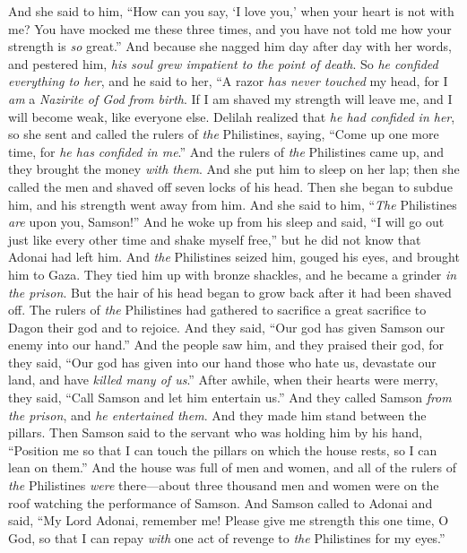 \begin{biblechapter}
\verse And she said to him, “How can you say, ‘I love you,’ when your heart is not with me? You have mocked me these three times, and you have not told me how your strength is \textit{so} great.”
\verse And because she nagged him day after day with her words, and pestered him, \textit{his soul grew impatient to the point of death}.
\verse So \textit{he confided everything to her}, and he said to her, “A razor \textit{has never touched} my head, for I \textit{am} a \textit{Nazirite of God} \textit{from birth}. If I am shaved my strength will leave me, and I will become weak, like everyone else.
\verse Delilah realized that \textit{he had confided in her}, so she sent and called the rulers of \textit{the} Philistines, saying, “Come up one more time, for \textit{he has confided in me}.” And the rulers of \textit{the} Philistines came up, and they brought the money \textit{with them}.
\verse And she put him to sleep on her lap; then she called the men and shaved off seven locks of his head. Then she began to subdue him, and his strength went away from him.
\verse And she said to him, “\textit{The} Philistines \textit{are} upon you, Samson!” And he woke up from his sleep and said, “I will go out just like every other time and shake myself free,” but he did not know that Adonai had left him.
\verse And \textit{the} Philistines seized him, gouged his eyes, and brought him to Gaza. They tied him up with bronze shackles, and he became a grinder \textit{in the prison}.
\verse But the hair of his head began to grow back after it had been shaved off.
\verse The rulers of \textit{the} Philistines had gathered to sacrifice a great sacrifice to Dagon their god and to rejoice. And they said, “Our god has given Samson our enemy into our hand.”
\verse And the people saw him, and they praised their god, for they said, “Our god has given into our hand those who hate us, devastate our land, and have \textit{killed many of us}.”
\verse After awhile, when their hearts were merry, they said, “Call Samson and let him entertain us.” And they called Samson \textit{from the prison}, and \textit{he entertained them}. And they made him stand between the pillars.
\verse Then Samson said to the servant who was holding him by his hand, “Position me so that I can touch the pillars on which the house rests, so I can lean on them.”
\verse And the house was full of men and women, and all of the rulers of \textit{the} Philistines \textit{were} there—about three thousand men and women were on the roof watching the performance of Samson.
 And Samson called to Adonai and said, “My Lord Adonai, remember me! Please give me strength this one time, O God, so that I can repay \textit{with} one act of revenge to \textit{the} Philistines for my eyes.”

\end{biblechapter}
